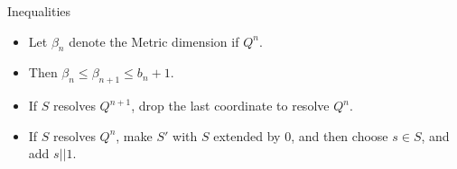 \documentclass{beamer}
\begin{document}
\begin{frame}{Inequalities}
  \begin{itemize}[<+->]
  \item Let $\beta_n$ denote the Metric dimension if $Q^n$.
  \item Then $\beta_n \le \beta_{n+1} \le b_n + 1$.
  \item If $S$ resolves $Q^{n+1}$, drop the last coordinate to resolve
    $Q^n$.
  \item If $S$ resolves $Q^n$, make $S'$ with $S$ extended by 0, and
    then choose $s \in S$, and add $s || 1$.
  \end{itemize}
\end{frame}
\end{document}
